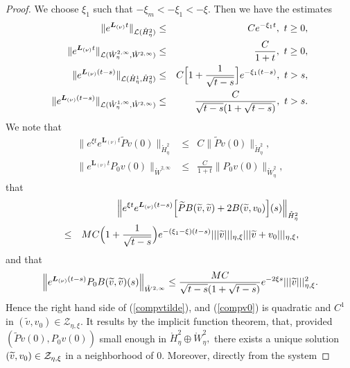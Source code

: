 \documentclass[11pt]{article}
\begin{document}
\begin{proof}
We choose $\xi_1$ such that $- \xi_m <  - \xi_1 < -  \xi$.
Then we have the estimates%
\begin{eqnarray*}
\|e^{\boldsymbol{L}_{(\nu )}t}\|_{\mathcal{L}(\mathring{H}_{\eta}^{2})} &\leq
&Ce^{-\xi _{1}t},\text{ }t\geq 0, \\
\|e^{\boldsymbol{L}_{(\nu )}t}\|_{\mathcal{L}(\mathring{W}_{\eta}^{2,\infty },%
\mathring{W}^{2,\infty })} &\leq &\frac{C}{1+t},\text{ }t\geq 0, \\
\|e^{\boldsymbol{L}_{(\nu )}(t-s)}\|_{\mathcal{L}(\mathring{H}_{\eta}^{1},%
\mathring{H}_{\eta}^{2})} &\leq &C \Bigl[1+\frac{1}{\sqrt{t-s}} \Bigr] e^{-\xi_{1}(t-s)},\text{ }t>s, \\
\|e^{\boldsymbol{L}_{(\nu )}(t-s)}\|_{\mathcal{L}(\mathring{W}_{\eta}^{1,\infty
},\mathring{W}^{2,\infty })} &\leq &\frac{C}{\sqrt{t-s}(1 + \sqrt{t-s})},\text{ }t>s.
\end{eqnarray*}%
We note that%
\begin{eqnarray*}
\|e^{\xi t}e^{\boldsymbol{L}_{(\nu )}t}\widetilde{P}v(0)\|_{\mathring{H}%
_{\eta}^{2}} &\leq &C\|\widetilde{P}v(0)\|_{\mathring{H}_{\eta}^{2}}, \\
\|e^{\boldsymbol{L}_{(\nu )}t}P_{0}v(0)\|_{\mathring{W}^{2,\infty }} &\leq &%
\frac{C}{1+t}\|P_{0}v(0)\|_{\mathring{W}_{\eta}^{2}},
\end{eqnarray*}%
that
\begin{eqnarray*}
&&\Bigl\|e^{\xi t}e^{\boldsymbol{L}_{(\nu )}(t-s)} \Bigl[\widetilde{P}B(\widetilde{v}%
,\widetilde{v})+2B(\widetilde{v},v_{0})\Bigr](s)\Bigr\|_{\mathring{H}_{\eta}^{2}} \\
&\leq &MC \Bigl(1+\frac{1}{\sqrt{t-s}} \Bigr)e^{-(\xi _{1}-\xi )(t-s)}|||%
\widetilde{v}|||_{\eta,\xi }|||\widetilde{v}+v_{0}|||_{\eta,\xi },
\end{eqnarray*}%
and that 
\begin{equation*}
\Bigl\|e^{\boldsymbol{L}_{(\nu )}(t-s)}P_{0}B(\widetilde{v},\widetilde{v})(s) \Bigr\|_{%
\mathring{W}^{2,\infty }}\leq \frac{MC}{\sqrt{t-s} (1 + \sqrt{t-s})}e^{-2\xi s}|||%
\widetilde{v}|||_{\eta,\xi }^{2}.
\end{equation*}%
Hence the right hand side of (\ref{compvtilde}), and (\ref{compv0}) is
quadratic and $C^{1}$ in $(\widetilde{v},v_{0})\in \mathcal{Z}_{\eta,\xi }.$
It results by the implicit function theorem, that, provided $(\widetilde{P}%
v(0),P_{0}v(0))$ small enough in $\mathring{H}_{\eta}^{2}\oplus \mathring{W}%
_{\eta}^{2},$ there exists a unique solution $(\widetilde{v},v_{0})\in \mathcal{%
Z}_{\eta,\xi}$ in a neighborhood of $0.$ Moreover, directly from the system

\end{proof}
\end{document}
